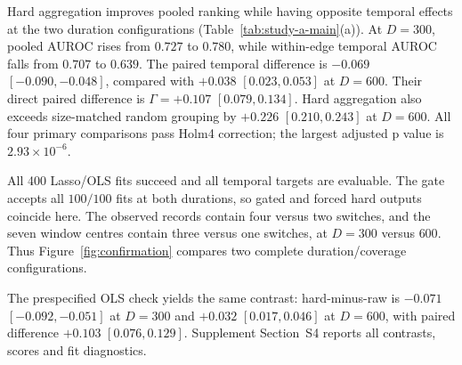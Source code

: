 Hard aggregation improves pooled ranking while having opposite temporal
effects at the two duration configurations (Table~\ref{tab:study-a-main}(a)).
At $D=300$, pooled AUROC rises from $0.727$ to $0.780$, while within-edge
temporal AUROC falls from $0.707$ to $0.639$. The paired temporal difference
is $-0.069$ $[-0.090,-0.048]$, compared with $+0.038$ $[0.023,0.053]$
at $D=600$. Their direct paired difference is $\Gamma=+0.107$
$[0.079,0.134]$. Hard aggregation also exceeds size-matched random grouping
by $+0.226$ $[0.210,0.243]$ at $D=600$. All four primary comparisons pass
Holm4 correction; the largest adjusted p value is $2.93\times10^{-6}$.

All 400 Lasso/OLS fits succeed and all temporal targets are evaluable. The
gate accepts all $100/100$ fits at both durations, so gated and forced hard
outputs coincide here. The observed records contain four versus two switches,
and the seven window centres contain three versus one switches, at
$D=300$ versus $600$. Thus Figure~\ref{fig:confirmation} compares two
complete duration/coverage configurations.

The prespecified OLS check yields the same contrast: hard-minus-raw is
$-0.071$ $[-0.092,-0.051]$ at $D=300$ and $+0.032$ $[0.017,0.046]$
at $D=600$, with paired difference $+0.103$ $[0.076,0.129]$.
Supplement Section~S4 reports all contrasts, scores and fit diagnostics.
